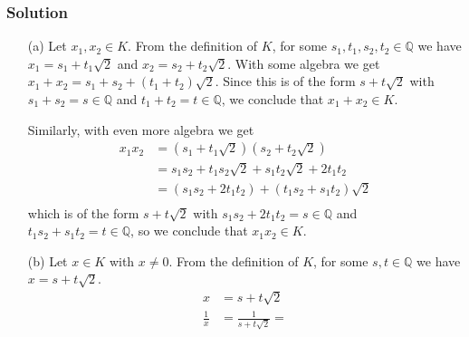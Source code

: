 \documentclass[12pt]{article}
\begin{document}
\subsubsection*{Solution}
\begin{itemize}
\item[(a)] Let $x_1, x_2 \in K$. From the definition of $K$, for some $s_1, t_1, s_2, t_2 \in \mathbb{Q}$ we have $x_1 = s_1 + t_1 \sqrt{2}$ and $x_2 = s_2 + t_2\sqrt{2}$. With some algebra we get $x_1 + x_2 = s_1 + s_2 + \left(t_1 + t_2\right)\sqrt{2}$. Since this is of the form $s + t\sqrt{2}$ with $s_1 + s_2 = s \in \mathbb{Q}$ and $t_1 + t_2 = t \in \mathbb{Q}$, we conclude that $x_1 + x_2 \in K$.

Similarly, with even more algebra we get
\begin{align*}
x_1x_2 &= \left(s_1 + t_1\sqrt{2}\right) \left(s_2 + t_2\sqrt{2}\right) \\
&= s_1s_2 + t_1s_2\sqrt{2} + s_1t_2\sqrt{2} + 2t_1t_2 \\
&= \left(s_1s_2 + 2t_1t_2\right) + \left(t_1s_2 + s_1t_2\right)\sqrt{2} \\
\end{align*}
which is of the form $s + t \sqrt{2}$ with $s_1s_2 + 2t_1t_2 = s \in \mathbb{Q}$ and $t_1s_2 + s_1t_2 = t \in \mathbb{Q}$, so we conclude that $x_1x_2 \in K$.
\item[(b)] Let $x \in K$ with $x \neq 0$. From the definition of $K$, for some $s, t \in \mathbb{Q}$ we have $x = s + t\sqrt{2}$.
\begin{align*}
x &= s + t\sqrt{2} \\
\frac{1}{x} &= \frac{1}{s + t\sqrt{2}} = \\ 
\end{align*}
\end{itemize}
\end{document}
